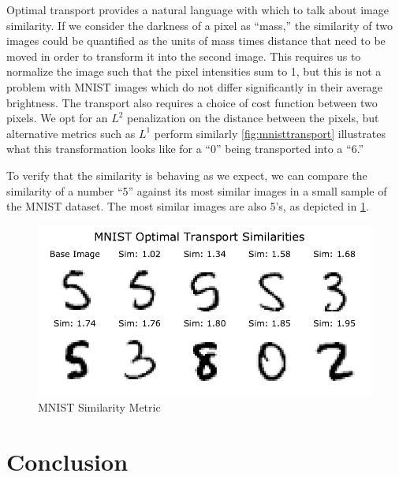 \documentclass{article}
\theoremstyle{definition}
\theoremstyle{remark}
\begin{document}
Optimal transport provides a natural language with which to talk about image
similarity. If we consider the darkness of a pixel as ``mass,''  the similarity
of two images could be quantified as the units of mass times distance that need
to be moved in order to transform it into the second image. This requires us to
normalize the image such that the pixel intensities sum to 1, but this is not a
problem with MNIST images which do not differ significantly in their average
brightness. The transport also requires a choice of cost function between two
pixels. We opt for an $L^2$ penalization on the distance between the pixels, but
alternative metrics such as $L^1$ perform similarly \cref{fig:mnisttransport}
illustrates what this transformation looks like for a ``0'' being transported
into a ``6.'' 

To verify that the similarity is behaving as we expect, we can compare the
similarity of a number ``5'' against its most similar images in a small sample
of the MNIST dataset. The most similar images are also 5's, as depicted in
\cref{fig:mnistsim}.


\begin{figure}[tb]
  \centering
  \includegraphics{../../code/mnist-similarity.pdf}
  \caption{MNIST Similarity Metric}
  \label{fig:mnistsim}
\end{figure}




\section{Conclusion} %
\label{sec:conclusion}






\end{document}
